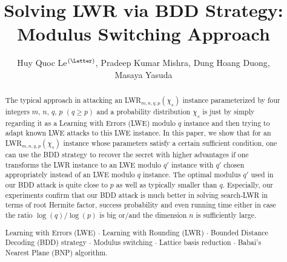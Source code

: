\documentclass[runningheads]{llncs}
\newcommand{\keywords}[1]{\par\addvspace\baselineskip
	\noindent\keywordname\enspace\ignorespaces#1}
\begin{document}
\title{Solving LWR via BDD Strategy:\\
Modulus Switching Approach}

\author{Huy Quoc Le$^\textrm{(\Letter)}$, Pradeep Kumar Mishra,  Dung Hoang Duong, \\ Masaya Yasuda}

\maketitle

\medskip

\begin{abstract}
The typical approach in attacking an LWR$_{m,n,q,p}(\chi_s)$ instance parameterized by four integers $m$, $ n$, $q$, $p$ $ (q \geq p)$ and a probability distribution $\chi_s$ is just by simply regarding it as a Learning with Errors (LWE) modulo $q$ instance and then trying to adapt known LWE attacks to this LWE instance. In this paper, we show that for an LWR$_{m,n,q,p}(\chi_s)$ instance whose parameters satisfy a certain sufficient condition, one can use the BDD strategy to recover the secret with higher advantages if one transforms the LWR instance to an LWE modulo $q'$ instance with $q'$ chosen appropriately instead of an LWE modulo $q$ instance.  The optimal modulus $q'$ used in our BDD attack is quite close to $p$ as well as typically smaller than $q$. Especially, our experiments confirm that our BDD attack is much better in solving search-LWR in terms of root Hermite factor, success probability and even running time either in case the ratio $\log (q)/ \log (p)$ is big or/and the dimension $n$ is sufficiently large.

\keywords{Learning with Errors (LWE) $\cdot$ Learning with Rounding (LWR) $\cdot$ Bounded Distance Decoding (BDD) strategy $\cdot$ Modulus switching $\cdot$ Lattice basis reduction $\cdot$  Babai's Nearest Plane (BNP) algorithm.}
\end{abstract}
\end{document}
